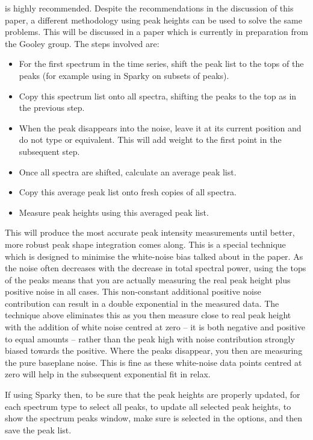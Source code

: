 is highly recommended.  Despite the recommendations in the discussion of this paper, a different methodology using peak heights can be used to solve the same problems.  This will be discussed in a paper which is currently in preparation from the Gooley group.  The steps involved are:

\begin{itemize}
\item For the first spectrum in the time series, shift the peak list to the tops of the peaks (for example using  in Sparky on subsets of peaks).
\item Copy this  spectrum list onto all spectra, shifting the peaks to the top as in the previous step.
\item When the peak disappears into the noise, leave it at its current position and do not type  or equivalent.  This will add weight to the first point in the subsequent step.
\item Once all spectra are shifted, calculate an average peak list.
\item Copy this average peak list onto fresh copies of all spectra.
\item Measure peak heights using this averaged peak list.
\end{itemize}

This will produce the most accurate peak intensity measurements until better, more robust peak shape integration comes along.  This is a special technique which is designed to minimise the white-noise bias talked about in the \citet{Viles01} paper.  As the noise often decreases with the decrease in total spectral power, using the tops of the peaks means that you are actually measuring the real peak height plus positive noise in all cases.  This non-constant additional positive noise contribution can result in a double exponential in the measured data.  The technique above eliminates this as you then measure close to real peak height with the addition of white noise centred at zero -- it is both negative and positive to equal amounts -- rather than the peak high with noise contribution strongly biased towards the positive.  Where the peaks disappear, you then are measuring the pure baseplane noise.  This is fine as these white-noise data points centred at zero will help in the subsequent exponential fit in relax. 

If using Sparky then, to be sure that the peak heights are properly updated, for each spectrum type  to select all peaks,  to update all selected peak heights,  to show the spectrum peaks window, make sure  is selected in the options, and then save the peak list.



